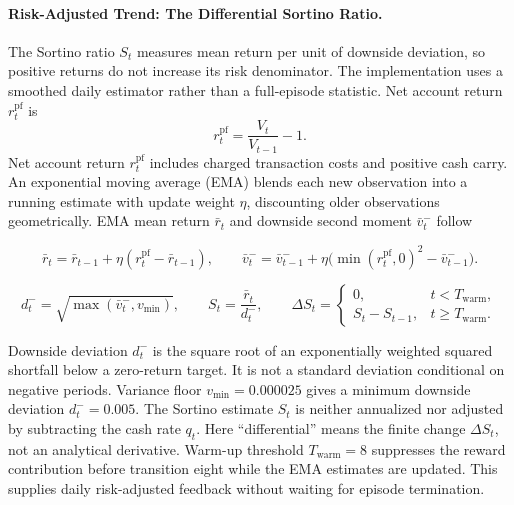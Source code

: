 \paragraph{Risk-Adjusted Trend: The Differential Sortino Ratio.}

The Sortino ratio \(S_t\) measures mean return per unit of downside deviation, so positive returns do not increase its risk denominator. The implementation uses a smoothed daily estimator rather than a full-episode statistic. Net account return \(r_t^{\mathrm{pf}}\) is
\begin{equation}
r_t^{\mathrm{pf}}=\frac{V_t}{V_{t-1}}-1.
\label{eq:account-return}
\end{equation}
Net account return \(r_t^{\mathrm{pf}}\) includes charged transaction costs and positive cash carry. An exponential moving average (EMA) blends each new observation into a running estimate with update weight \(\eta\), discounting older observations geometrically. EMA mean return \(\bar r_t\) and downside second moment \(\bar v_t^-\) follow

\begin{equation}
\bar r_t=\bar r_{t-1}+\eta(r_t^{\mathrm{pf}}-\bar r_{t-1}),\qquad
\bar v_t^-=\bar v_{t-1}^-+\eta\big(\min(r_t^{\mathrm{pf}},0)^2-\bar v_{t-1}^-\big).
\label{eq:sortino-ema}
\end{equation}

\begin{equation}
d_t^-=\sqrt{\max(\bar v_t^-,v_{\min})},\qquad
S_t=\frac{\bar r_t}{d_t^-},\qquad
\Delta S_t=
\begin{cases}
0,&t<T_{\mathrm{warm}},\\
S_t-S_{t-1},&t\geq T_{\mathrm{warm}}.
\end{cases}
\label{eq:sortino}
\end{equation}

Downside deviation \(d_t^-\) is the square root of an exponentially weighted squared shortfall below a zero-return target. It is not a standard deviation conditional on negative periods. Variance floor \(v_{\min}=0.000025\) gives a minimum downside deviation \(d_t^-=0.005\). The Sortino estimate \(S_t\) is neither annualized nor adjusted by subtracting the cash rate \(q_t\). Here ``differential'' means the finite change \(\Delta S_t\), not an analytical derivative. Warm-up threshold \(T_{\mathrm{warm}}=8\) suppresses the reward contribution before transition eight while the EMA estimates are updated. This supplies daily risk-adjusted feedback without waiting for episode termination.

